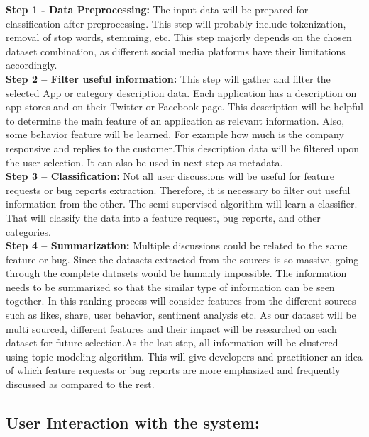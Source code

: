 \textbf{Step 1 - Data Preprocessing: } The input data will be prepared for classification after preprocessing. This step will probably include tokenization, removal of stop words, stemming, etc. This step majorly depends on the chosen dataset combination, as different social media platforms have their limitations accordingly.\\

\textbf{Step 2 –  Filter useful information: } This step will gather and filter the selected App or category description data. Each application has a description on app stores and on their Twitter or Facebook page. This description will be helpful to determine the main feature of an application as relevant information. Also, some behavior feature will be learned.  For example how much is the company responsive and replies to the customer.This description data will be filtered upon the user selection. It can also be used in next step as metadata.\\

\textbf{Step 3 –  Classification: } Not all user discussions will be useful for feature requests or bug reports extraction. Therefore, it is necessary to filter out useful information from the other. The semi-supervised algorithm will learn a classifier. That will classify the data into a feature request, bug reports, and other categories.\\

\textbf{Step 4 – Summarization: } Multiple discussions could be related to the same feature or bug.
Since the datasets extracted from the sources is so massive, going through the complete datasets
would be humanly impossible. The information needs to be summarized so that the similar type
of information can be seen together. In this ranking process will consider features from the different sources such as likes, share, user behavior, sentiment analysis etc. As our dataset will be multi sourced, different features and their impact will be researched on each dataset for future selection.As the last step, all information will be clustered using topic modeling algorithm. This will
give developers and practitioner an idea of which feature requests or bug reports are more emphasized and frequently discussed as compared to the rest.\\

\subsection{User Interaction with the system:}

